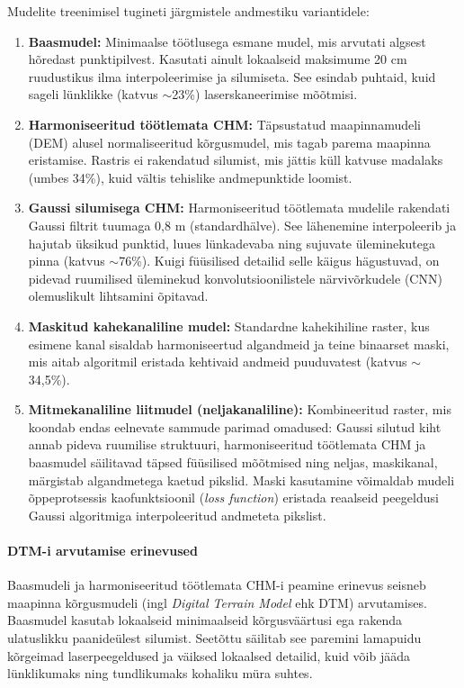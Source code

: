     Mudelite treenimisel tugineti järgmistele andmestiku variantidele:
    \begin{enumerate}
        \item \textbf{Baasmudel:} Minimaalse töötlusega esmane mudel, mis arvutati algsest hõredast punktipilvest. Kasutati ainult lokaalseid maksimume 20 cm ruudustikus ilma interpoleerimise ja silumiseta. See esindab puhtaid, kuid sageli lünklikke (katvus $\sim$23\%) laserskaneerimise mõõtmisi.

        \item \textbf{Harmoniseeritud töötlemata CHM:} Täpsustatud maapinnamudeli (DEM) alusel normaliseeritud kõrgusmudel, mis tagab parema maapinna eristamise. Rastris ei rakendatud silumist, mis jättis küll katvuse madalaks (umbes 34\%), kuid vältis tehislike andmepunktide loomist.

        \item \textbf{Gaussi silumisega CHM:} Harmoniseeritud töötlemata mudelile rakendati Gaussi filtrit tuumaga 0,8 m (standardhälve). See lähenemine interpoleerib ja hajutab üksikud punktid, luues lünkadevaba ning sujuvate üleminekutega pinna (katvus $\sim$76\%). Kuigi füüsilised detailid selle käigus hägustuvad, on pidevad ruumilised üleminekud konvolutsioonilistele närvivõrkudele (CNN) olemuslikult lihtsamini õpitavad.

        \item \textbf{Maskitud kahekanaliline mudel:} Standardne kahekihiline raster, kus esimene kanal sisaldab harmoniseertud algandmeid ja teine binaarset maski, mis aitab algoritmil eristada kehtivaid andmeid puuduvatest (katvus $\sim$34,5\%).

        \item \textbf{Mitmekanaliline liitmudel (neljakanaliline):} Kombineeritud raster, mis koondab endas eelnevate sammude parimad omadused: Gaussi silutud kiht annab pideva ruumilise struktuuri, harmoniseeritud töötlemata CHM ja baasmudel säilitavad täpsed füüsilised mõõtmised ning neljas, maskikanal, märgistab algandmetega kaetud pikslid. Maski kasutamine võimaldab mudeli õppeprotsessis kaofunktsioonil (\textit{loss function}) eristada reaalseid peegeldusi Gaussi algoritmiga interpoleeritud andmeteta pikslist.        
    \end{enumerate}

    \paragraph{DTM-i arvutamise erinevused}
    Baasmudeli ja harmoniseeritud töötlemata CHM-i peamine erinevus seisneb maapinna kõrgusmudeli (ingl \textit{Digital Terrain Model} ehk DTM) arvutamises. Baasmudel kasutab lokaalseid minimaalseid kõrgusväärtusi ega rakenda ulatuslikku paanideülest silumist. Seetõttu säilitab see paremini lamapuidu kõrgeimad laserpeegeldused ja väiksed lokaalsed detailid, kuid võib jääda lünklikumaks ning tundlikumaks kohaliku müra suhtes.

